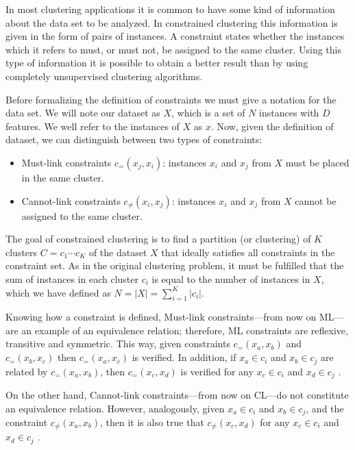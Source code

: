 \documentclass[review]{elsarticle}
\begin{document}
In most clustering applications it is common to have some kind of information about the data set to be analyzed. In constrained clustering this information is given in the form of pairs of instances. A constraint states whether the instances which it refers to must, or must not, be assigned to the same cluster. Using this type of information it is possible to obtain a better result than by using completely unsupervised clustering algorithms.

Before formalizing the definition of constraints we must give a notation for the data set. We will note our dataset as $X$, which is a set of $N$ instances with $D$ features. We well refer to the instances of $X$ as $x$. Now, given the definition of dataset, we can distinguish between two types of constraints:

\begin{itemize}

	\item Must-link constraints $c_=(x_j,x_i)$: instances $x_i$ and $x_j$ from $X$ must be placed in the same cluster.

	\item Cannot-link constraints $c_{\neq}(x_i,x_j)$: instances $x_i$ and $x_j$ from $X$ cannot be assigned to the same cluster.

\end{itemize}

The goal of constrained clustering is to find a partition (or clustering) of $K$ clusters $C = {c_1 \cdots c_K}$ of the dataset $X$ that ideally satisfies all constraints in the constraint set. As in the original clustering problem, it must be fulfilled that the sum of instances in each cluster $c_i$ is equal to the number of instances in $X$, which we have defined as $N = |X| = \sum_{i = 1}^{K} |c_i|$.

Knowing how a constraint is defined, Must-link constraints---from now on ML---are an example of an equivalence relation; therefore, ML constraints are reflexive, transitive and symmetric. This way, given constraints $c_=(x_a,x_b)$ and $c_=(x_b,x_c)$ then $c_=(x_a,x_c)$ is verified. In addition, if $x_a \in c_i$ and $x_b \in c_j$ are related by $c_=(x_a,x_b)$, then $c_=(x_c,x_d)$ is verified for any $x_c \in c_i$ and $x_d \in c_j$ \cite{xu2013improving}\cite{davidson2007survey}.

On the other hand, Cannot-link constraints---from now on CL---do not constitute an equivalence relation. However, analogously, given $x_a \in c_i$ and $x_b \in c_j$, and the constraint $c_{\neq}(x_a,x_b)$, then it is also true that $c_{\neq}(x_c,x_d)$ for any $x_c \in c_i$ and $x_d \in c_j$ \cite{davidson2007survey}.
\end{document}
